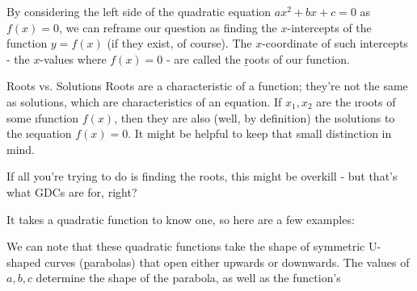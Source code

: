By considering the left side of the quadratic equation $ax^2+bx+c=0$ as $f(x)=0$, we can reframe our question as finding the $x$-intercepts of the function $y=f(x)$ (if they exist, of course). The $x$-coordinate of such intercepts - the $x$-values where $f(x)=0$ - are called the \b{roots} of our function. 
\begin{insight}{Roots vs. Solutions}
Roots are a characteristic of a function; they're not the same as solutions, which are characteristics of an equation. If $x_1, x_2$ are the \i{roots} of some \i{function} $f(x)$, then they are also (well, by definition) the \i{solutions} to the \i{equation} $f(x)=0$. It might be helpful to keep that small distinction in mind.
\end{insight}

If all you're trying to do is finding the roots, this might be overkill - but that's what GDCs are for, right?

It takes a quadratic function to know one, so here are a few examples:
\begin{center}
    \qquad\qquad
    \qquad\qquad
\end{center}

We can note that these quadratic functions take the shape of symmetric U-shaped curves (\b{parabolas}) that open either upwards or downwards. The values of $a, b, c$ determine the shape of the parabola, as well as the function's 